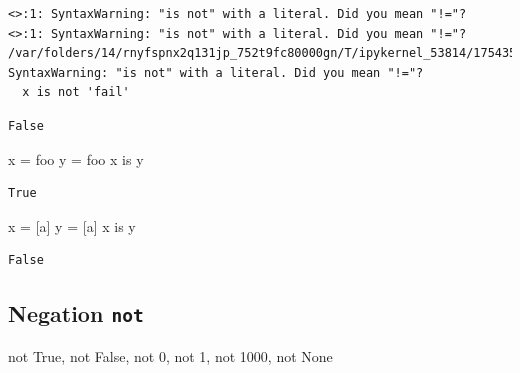 \documentclass[
  letterpaper,
  DIV=11,
  numbers=noendperiod]{scrreprt}
\newenvironment{Shaded}{\begin{snugshade}}{\end{snugshade}}
\newcommand{\DecValTok}[1]{\textcolor[rgb]{0.68,0.00,0.00}{#1}}
\newcommand{\KeywordTok}[1]{\textcolor[rgb]{0.00,0.23,0.31}{#1}}
\newcommand{\NormalTok}[1]{\textcolor[rgb]{0.00,0.23,0.31}{#1}}
\newcommand{\OperatorTok}[1]{\textcolor[rgb]{0.37,0.37,0.37}{#1}}
\newcommand{\StringTok}[1]{\textcolor[rgb]{0.13,0.47,0.30}{#1}}
\newcommand{\VariableTok}[1]{\textcolor[rgb]{0.07,0.07,0.07}{#1}}
\begin{document}
\begin{verbatim}
<>:1: SyntaxWarning: "is not" with a literal. Did you mean "!="?
<>:1: SyntaxWarning: "is not" with a literal. Did you mean "!="?
/var/folders/14/rnyfspnx2q131jp_752t9fc80000gn/T/ipykernel_53814/1754352910.py:1: SyntaxWarning: "is not" with a literal. Did you mean "!="?
  x is not 'fail'
\end{verbatim}

\begin{verbatim}
False
\end{verbatim}

\begin{Shaded}
\begin{Highlighting}[]
\NormalTok{x }\OperatorTok{=} \StringTok{\textquotesingle{}foo\textquotesingle{}}
\NormalTok{y }\OperatorTok{=} \StringTok{\textquotesingle{}foo\textquotesingle{}}
\NormalTok{x }\KeywordTok{is}\NormalTok{ y}
\end{Highlighting}
\end{Shaded}

\begin{verbatim}
True
\end{verbatim}

\begin{Shaded}
\begin{Highlighting}[]
\NormalTok{x }\OperatorTok{=}\NormalTok{ [}\StringTok{\textquotesingle{}a\textquotesingle{}}\NormalTok{]}
\NormalTok{y }\OperatorTok{=}\NormalTok{ [}\StringTok{\textquotesingle{}a\textquotesingle{}}\NormalTok{]}
\NormalTok{x }\KeywordTok{is}\NormalTok{ y}
\end{Highlighting}
\end{Shaded}

\begin{verbatim}
False
\end{verbatim}

\hypertarget{negation-not}{%
\subsection{\texorpdfstring{Negation
\texttt{not}}{Negation not}}\label{negation-not}}

\begin{Shaded}
\begin{Highlighting}[]
\KeywordTok{not} \VariableTok{True}\NormalTok{, }\KeywordTok{not} \VariableTok{False}\NormalTok{, }\KeywordTok{not} \DecValTok{0}\NormalTok{, }\KeywordTok{not} \DecValTok{1}\NormalTok{, }\KeywordTok{not} \DecValTok{1000}\NormalTok{, }\KeywordTok{not} \VariableTok{None}
\end{Highlighting}
\end{Shaded}
\end{document}
